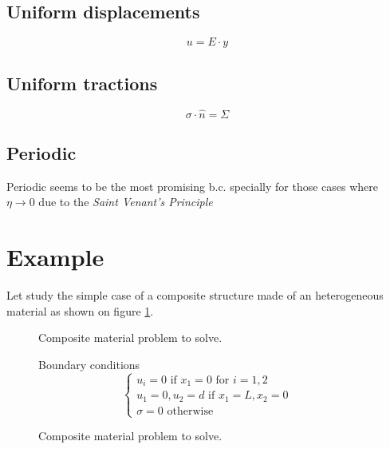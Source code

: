 \subsection{Uniform displacements}
\begin{equation}
u = E \cdot y
\end{equation}

\subsection{Uniform tractions}
\begin{equation}
\sigma \cdot \hat{n} = \Sigma
\end{equation}

\subsection{Periodic}
Periodic seems to be the most promising b.c. specially for those cases where $\eta \rightarrow 0$ 
due to the \emph{Saint Venant's Principle}

\section{Example}

Let study the simple case of a composite structure made of an heterogeneous material as shown on figure
\ref{fig_rve_measures}.

\begin{figure}[h!]
\resizebox{6cm}{!}{
 
}
\caption{Composite material problem to solve.}
\end{figure}

\begin{figure}[h!]
\fboxsep=0pt
\noindent
\begin{minipage}[t]{0.3\linewidth}
\vspace{0pt}
\begin{flushleft}
\resizebox{6cm}{!}{
 
}
\end{flushleft}
\end{minipage}
\begin{minipage}[t]{0.48\linewidth}
\vspace{0pt}
\begin{flushleft}
Boundary conditions
\[
\begin{cases}
   u_i = 0 \text{ if } x_1 = 0 \text{ for } i=1,2\\
   u_1 = 0, u_2 = d \text{ if } x_1 = L, x_2 = 0\\
   \sigma = 0 \text{ otherwise}
\end{cases}
\]
\end{flushleft}
\end{minipage}
\caption{Composite material problem to solve.}
\label{fig_rve_measures}
\end{figure}

